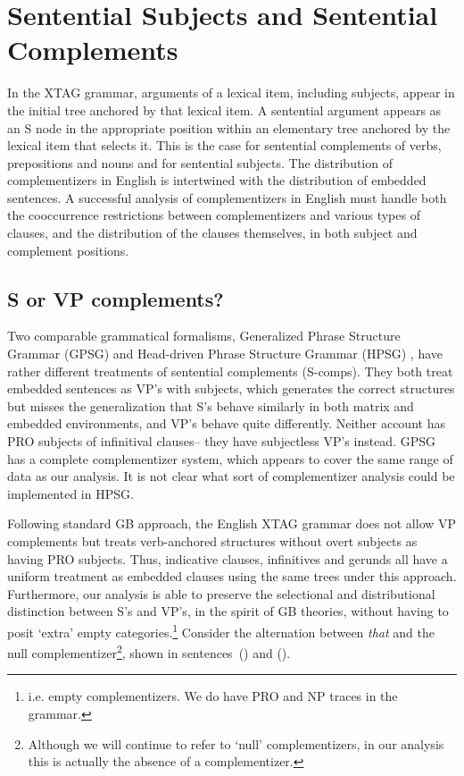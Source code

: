 
\chapter{Sentential Subjects and Sentential Complements}
\label{scomps-section}

In the XTAG grammar, arguments of a lexical item, including
subjects, appear in the initial tree anchored by that lexical item.  A
sentential argument appears as an S node in the appropriate position
within an elementary tree anchored by the lexical item that selects
it. This is the case for sentential complements of verbs, prepositions
and nouns and for sentential subjects. The distribution of
complementizers in English is intertwined with the distribution of
embedded sentences.  A successful analysis of complementizers in
English must handle both the cooccurrence restrictions between
complementizers and various types of clauses, and the distribution of
the clauses themselves, in both subject and complement positions.

\section{S or VP complements?}
 
Two comparable grammatical formalisms, Generalized Phrase Structure
Grammar (GPSG) \cite{gazdar85} and Head-driven Phrase Structure
Grammar (HPSG) \cite{PollardSag94:BK}, have rather different
treatments of sentential complements (S-comps).  They both treat
embedded sentences as VP's with subjects, which generates the correct
structures but misses the generalization that S's behave similarly in
both matrix and embedded environments, and VP's behave quite
differently.  Neither account has PRO\label{PRO} subjects of
infinitival clauses-- they have subjectless VP's instead.  GPSG has a
complete complementizer system, which appears to cover the same range
of data as our analysis.  It is not clear what sort of complementizer
analysis could be implemented in HPSG.

Following standard GB approach, the English XTAG grammar does not
allow VP complements but treats verb-anchored structures without overt
subjects as having PRO subjects. Thus, indicative clauses, infinitives
and gerunds all have a uniform treatment as embedded clauses using the
same trees under this approach. Furthermore, our analysis is able to
preserve the selectional and distributional distinction between S's and
VP's, in the spirit of GB theories, without having to posit `extra'
empty categories.\footnote{i.e. empty complementizers. We do have PRO
and NP traces in the grammar.} Consider the alternation between {\it
that} and the null complementizer\footnote{Although we will continue
to refer to `null' complementizers, in our analysis this is actually
the absence of a complementizer.}, shown in sentences~() and ().

